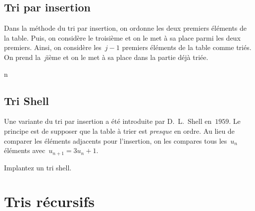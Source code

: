 \subsection{Tri par insertion}
\label{sec:TriParInsertion}
\begin{exercice}
  Dans la m\'ethode du tri par insertion, on ordonne les deux premiers
  \'el\'ements de la table. Puis, on  consid\`ere le troisi\`eme et on
  le met \`a sa  place parmi les  deux premiers. Ainsi, on consid\`ere
  les~${j-1}$ premiers  \'el\'ements de  la  table comme tri\'es.   On
  prend la~$j$i\`eme et on le met \`a sa place dans la partie d\'ej\`a
  tri\'ee.
  \ifcorrection
  \begin{correction}
    n
  \end{correction}
  \fi
\end{exercice}
\subsection{Tri Shell}
\label{sec:TriShell}
\begin{exercice}
  Une variante du  tri par insertion  a \'et\'e introduite par D.~L.\ 
  Shell en~$1959$. Le principe est de supposer  que la table \`a trier
  est \textit{presque} en ordre. Au lieu  de comparer les \'el\'ements
  adjacents  pour   l'insertion, on  les   compares  tous  les~$u_{n}$
  \'el\'ements avec~${u_{n+1}=3u_{n}+1}$.
  \par
  Implantez un tri shell.%
  \ifcorrection
  \begin{correction}
    
  \end{correction}
  \fi
\end{exercice}
\section{Tris r\'ecursifs}
\label{sec:TrisRecursifs}
